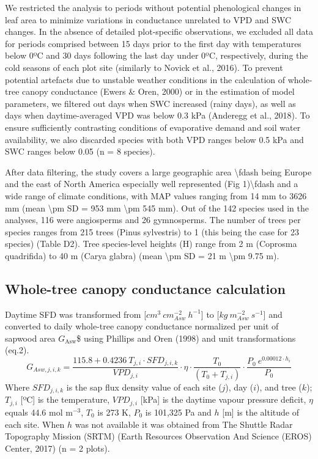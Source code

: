 \documentclass[11pt,twoside]{reedthesis}
\begin{document}
We restricted the analysis to periods without potential phenological
changes in leaf area to minimize variations in conductance unrelated to
VPD and SWC changes. In the absence of detailed plot-specific
observations, we excluded all data for periods comprised between 15 days
prior to the first day with temperatures below 0ºC and 30 days following
the last day under 0ºC, respectively, during the cold seasons of each
plot site (similarly to Novick et al., 2016). To prevent potential
artefacts due to unstable weather conditions in the calculation of
whole-tree canopy conductance (Ewers \& Oren, 2000) or in the estimation
of model parameters, we filtered out days when SWC increased (rainy
days), as well as days when daytime-averaged VPD was below 0.3 kPa
(Anderegg et al., 2018). To ensure sufficiently contrasting conditions
of evaporative demand and soil water availability, we also discarded
species with both VPD ranges below 0.5 kPa and SWC ranges below 0.05 (n
= 8 species).\par

After data filtering, the study covers a large geographic area
\textbackslash{}fdash being Europe and the east of North America
especially well represented (Fig 1)\textbackslash{}fdash and a wide
range of climate conditions, with MAP values ranging from 14 mm to 3626
mm (mean \textbackslash{}pm SD = 953 mm \textbackslash{}pm 545 mm). Out
of the 142 species used in the analyses, 116 were angiosperms and 26
gymnosperms. The number of trees per species ranges from 215 trees
(Pinus sylvestris) to 1 (this being the case for 23 species) (Table D2).
Tree species-level heights (H) range from 2 m (Coprosma quadrifida) to
40 m (Carya glabra) (mean \textbackslash{}pm SD = 21 m
\textbackslash{}pm 9.75 m).\par

\subsection{Whole-tree canopy conductance
calculation}\label{whole-tree-canopy-conductance-calculation}

Daytime SFD was transformed from
{[}\(cm^3 \: cm_{Asw}^{-2} \: h^{-1}\){]} to
{[}\(kg \: m_{Asw}^{-2} \: s^{-1}\){]} and converted to daily whole-tree
canopy conductance normalized per unit of sapwood area
\(G_{\text{Asw}}\)\$ using Phillips and Oren (1998) and unit
transformations (eq.2).
\begin{equation}
G_{Asw,j,i,k} = \frac{115.8 + 0.4236 \: T_{j , i} \cdot SFD_{j , i , k}}{VPD_{j,i}}\cdot \eta \cdot \frac{T_0}{(T_0 + T_{j,i})} \cdot \frac{P_0 \: e^{0.00012 \cdot h_i}}{P_0}
\end{equation}
Where \(SFD_{j,i,k}\) is the sap flux density value of each site
(\(j\)), day (\(i\)), and tree (\(k\)); \({T}_{j,i}\) {[}ºC{]} is the
temperature, \(VPD_{j,i}\) {[}kPa{]} is the daytime vapour pressure
deficit, \(\eta\) equals 44.6 mol \(\text{m}^{-3}\), \(T_0\) is 273 K,
\(P_0\) is 101,325 Pa and \(h\) {[}m{]} is the altitude of each site.
When \(h\) was not available it was obtained from The Shuttle Radar
Topography Mission (SRTM) (Earth Resources Observation And Science
(EROS) Center, 2017) (n = 2 plots).\par
\end{document}
